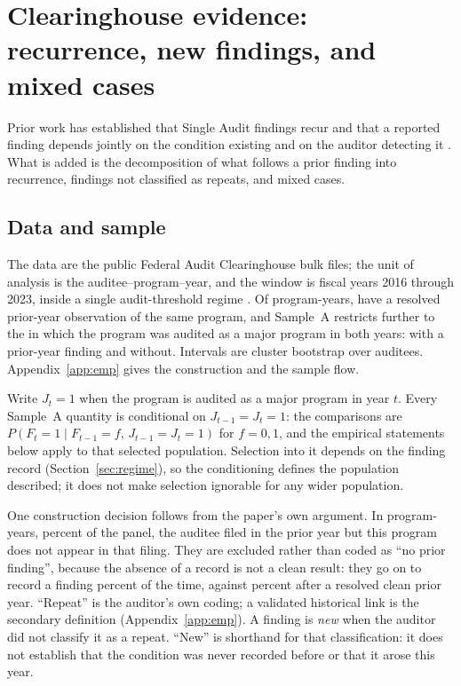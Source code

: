 \section{Clearinghouse evidence: recurrence, new findings, and mixed cases}\label{sec:fac}

Prior work has established that Single Audit findings recur and that a
reported finding depends jointly on the condition existing and on the auditor
detecting it
\citep{keating2005,petrovits2011,waymire2018,gao2002,gao2024,waddell2023}.
What is added is the decomposition of what follows a prior finding into
recurrence, findings not classified as repeats, and mixed cases.

\subsection{Data and sample}

The data are the public Federal Audit Clearinghouse bulk files; the unit of
analysis is the auditee--program--year, and the window is fiscal years 2016
through 2023, inside a single audit-threshold regime \citep{omb2024}. Of
\nPanelRows{} program-years, \nResolvedRows{} have a resolved prior-year
observation of the same program, and Sample~A restricts further to the
\nSampleA{} in which the program was audited as a major program in both
years: \nNPrior{} with a prior-year finding and \nNNoPrior{} without.
Intervals are cluster bootstrap over \nNAuditees{} auditees.
Appendix~\ref{app:emp} gives the construction and the sample flow.

Write $J_t = 1$ when the program is audited as a major program in year $t$.
Every Sample~A quantity is conditional on $J_{t-1} = J_t = 1$: the comparisons
are $P(F_t = 1 \mid F_{t-1} = f,\, J_{t-1} = J_t = 1)$ for $f = 0, 1$, and the
empirical statements below apply to that selected population. Selection into
it depends on the finding record (Section~\ref{sec:regime}), so the
conditioning defines the population described; it does not make selection
ignorable for any wider population.

One construction decision follows from the paper's own argument. In
\nSthreeN{} program-years, \nSthreePct{} percent of the panel, the auditee
filed in the prior year but this program does not appear in that filing. They
are excluded rather than coded as ``no prior finding'', because the absence of
a record is not a clean result: they go on to record a finding
\nSthreePctFinding{} percent of the time, against \nStwoPctFinding{} percent
after a resolved clean prior year. ``Repeat'' is the auditor's own coding; a
validated historical link is the secondary definition
(Appendix~\ref{app:emp}). A finding is \emph{new} when the auditor did not
classify it as a repeat. ``New'' is shorthand for that classification: it does
not establish that the condition was never recorded before or that it arose
this year.

